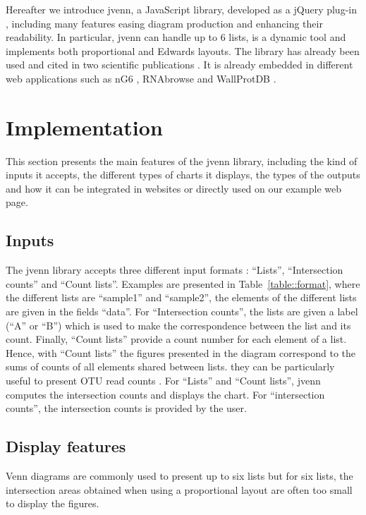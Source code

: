 \documentclass{bmcart}
\begin{document}
Hereafter we introduce jvenn, a JavaScript library, developed as a jQuery
plug-in \cite{jquery}, including many features easing diagram production and
enhancing their readability. In particular, jvenn can handle up to 6 lists, is 
a dynamic tool and implements both proportional and Edwards layouts. The 
library has already been used and cited in two scientific publications
\cite{Bianchia2013, Aravindraja2013}. It is already embedded in different web
applications such as nG6 \cite{Mariette2012}, RNAbrowse \cite{Mariette} and
WallProtDB \cite{SanClemente}.


\section*{Implementation}

This section presents the main features of the jvenn library, including the 
kind of inputs it accepts, the different types of charts it displays, the types 
of the outputs and how it can be integrated in websites or directly used on our 
example web page.

\subsection*{Inputs}

The jvenn library accepts three different input formats : ``Lists'',
``Intersection counts'' and ``Count lists''. Examples are presented in 
Table~\ref{table::format}, where the different lists are ``sample1'' and
``sample2'', the elements of the different lists are given in the fields
``data''. For ``Intersection counts'', the lists are given a label (``A'' or 
``B'') which is used to make the correspondence between the list and its count.
Finally, ``Count lists'' provide a count number for each element of a list.
Hence, with ``Count lists'' the figures presented in the diagram correspond to
the sums of counts of all elements shared between lists. they can be
particularly useful to present OTU read counts \cite{Aravindraja2013}. For
``Lists'' and ``Count lists'', jvenn computes the intersection counts and
displays the chart. For ``intersection counts'', the intersection counts is
provided by the user.

\subsection*{Display features}

Venn diagrams are commonly used to present up to six lists but for six 
lists, the intersection areas obtained when using a proportional layout are 
often too small to display the figures.
\end{document}
